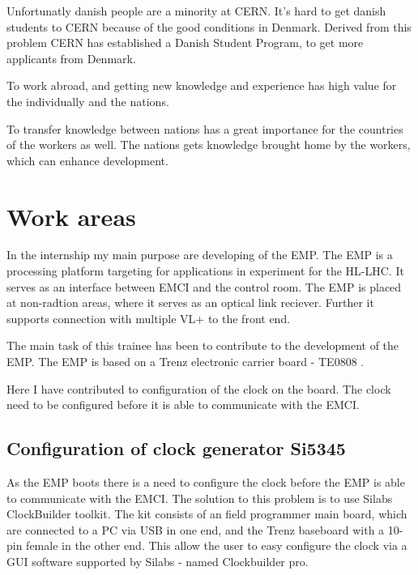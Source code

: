 Unfortunatly danish people are a minority at CERN. It's hard to get danish students to CERN because of the good conditions in Denmark. Derived from this problem CERN has established a Danish Student Program, to get more applicants from Denmark. 


To work abroad, and getting new knowledge and experience has high value for the individually and the nations. 

To transfer knowledge between nations has a great importance for the countries of the workers as well. The nations gets knowledge brought home by the workers, which can enhance development. 

\section{Work areas}

In the internship my main purpose are developing of the EMP. The EMP is a processing platform targeting for applications in experiment for the HL-LHC. It serves as an interface between EMCI and the control room. The EMP is placed at non-radtion areas, where it serves as an optical link reciever. Further it supports connection with multiple VL+ to the front end.



The main task of this trainee has been to contribute to the development of the EMP. The EMP is based on a Trenz electronic carrier board - TE0808 \cite{TEBF080828:online}. 







Here I have contributed to configuration of the clock on the board. The clock need to be configured before it is able to communicate with the EMCI.



\subsection{Configuration of clock generator Si5345}
As the EMP boots there is a need to configure the clock before the EMP is able to communicate with the EMCI. The solution to this problem is to use Silabs ClockBuilder toolkit. The kit consists of an field programmer main board, which are connected to a PC via USB in one end, and the Trenz baseboard with a 10-pin female in the other end. This allow the user to easy configure the clock via a GUI software supported by Silabs - named Clockbuilder pro.

